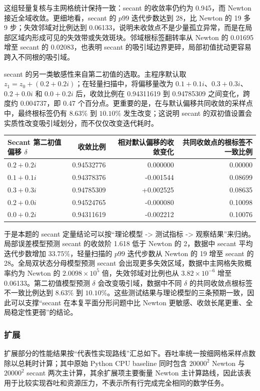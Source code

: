 \documentclass[12pt,a4paper,fontset=none]{ctexart}
\newcommand{\blocktitle}[1]{\subsubsection{#1}}
\newcounter{none}
\newif\ifwidetable
\begin{document}
这组轻量复核与主网格统计保持一致：secant 的收敛率仍约为 0.945，而 Newton 接近全域收敛。更细地看，secant 的 \(p99\) 迭代步数达到 28，比 Newton 的 19 多 9 步；失效邻域对比例达到 0.06133，说明未收敛点不是少量孤立异常，而是在局部区域内形成可见的失效带或失效斑块。邻域根标签翻转率从 Newton 的 0.01695 增至 secant 的 0.02083，也表明 secant 的吸引域边界更碎，局部初值扰动更容易跨入不同根的吸引域。

secant 的另一类敏感性来自第二初值的选取。主程序默认取 \(z_1=z_0+(0.2+0.2i)\)；在轻量扫描中，将偏移量改为 \(0.1+0.1i\)、\(0.3+0.3i\)、\(0.2+0.0i\) 和 \(0.0+0.2i\) 后，收敛比例在 0.94311619 到 0.94785309 之间变化，跨度约 0.004737，即 0.47 个百分点。更重要的是，在与默认偏移共同收敛的采样点中，最终根标签仍有 \(8.63\%\) 到 \(10.10\%\) 发生改变；这说明 secant 的双初值设置会实质性改变吸引域划分，而不仅仅改变迭代耗时。

{\def\LTcaptype{none} %
\widetabletrue
\begin{longtable}[]{@{}lrrr@{}}
\toprule\noalign{}
Secant 第二初值偏移 \(\delta\) & 收敛比例 & 相对默认偏移的收敛变化 & 共同收敛点的根标签不一致比例 \\
\midrule\noalign{}
\endhead
\bottomrule\noalign{}
\endlastfoot
\(0.2+0.2i\) & 0.94532776 & 0.000000 & 0.00000 \\
\(0.1+0.1i\) & 0.94378376 & -0.001544 & 0.08699 \\
\(0.3+0.3i\) & 0.94785309 & +0.002525 & 0.08635 \\
\(0.2+0.0i\) & 0.94524765 & -0.000080 & 0.10098 \\
\(0.0+0.2i\) & 0.94311619 & -0.002212 & 0.10076 \\
\end{longtable}
}

于是本题的 secant 定量结论可以按``理论模型 -> 测试指标 -> 观察结果''来归纳。局部误差模型预测 secant 的收敛阶 1.618 低于 Newton 的 2，数据中 secant 平均迭代步数增加 \(33.75\%\)，轻量扫描的 \(p99\) 迭代步数从 Newton 的 19 增至 secant 的 28。全局双状态分母模型预测 secant 会出现更多失效区域，数据中主网格失败概率约为 Newton 的 \(2.0098\times 10^5\) 倍，失效邻域对比例也从 \(3.82\times 10^{-6}\) 增至 0.06133。第二初值模型预测 \(\delta\) 会改变吸引域，数据中不同 \(\delta\) 的共同收敛点根标签不一致比例达到 \(8.63\%\) 到 \(10.10\%\)。这些测试结果与理论模型的三条预期一致，因此可以支撑``secant 在本复平面分形问题中比 Newton 更敏感、收敛长尾更重、全局稳定性更弱''的结论。

\blocktitle{扩展}

扩展部分的性能结果按``代表性实现路线''汇总如下。吞吐率统一按细网格采样点数除以总耗时计算；其中原始 Python CPU baseline 同时包含 \(20000^2\) Newton 与 \(20000^2\) secant 两次主计算，其余扩展项主要衡量 Newton 主计算路线，因此该表用于比较实现吞吐和资源压力，不表示所有行完成完全相同的数学任务。
\end{document}
